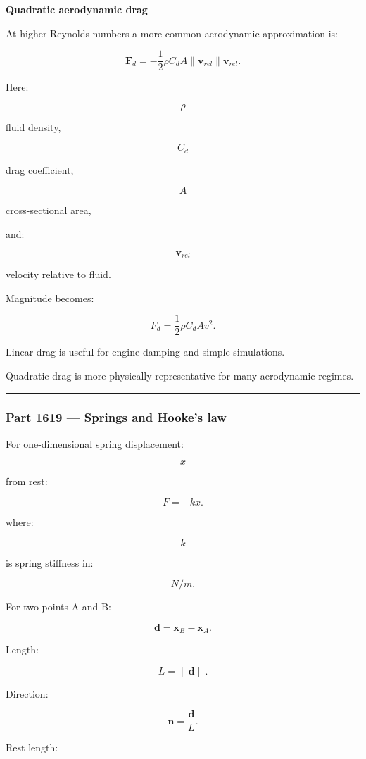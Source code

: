 \textbf{Quadratic aerodynamic drag}

At higher Reynolds numbers a more common aerodynamic approximation is:

\[
\boxed{
\mathbf{F}_d
=
-\frac12
\rho C_d A
\|\mathbf{v}_{rel}\|
\mathbf{v}_{rel}.
}
\]

Here:

\[
\rho
\]

fluid density,

\[
C_d
\]

drag coefficient,

\[
A
\]

cross-sectional area,

and:

\[
\mathbf{v}_{rel}
\]

velocity relative to fluid.

Magnitude becomes:

\[
F_d
=
\frac12\rho C_d A v^2.
\]

Linear drag is useful for engine damping and simple simulations.

Quadratic drag is more physically representative for many aerodynamic regimes.

\begin{center}\rule{0.5\linewidth}{0.5pt}\end{center}

\subsubsection{Part 1619 --- Springs and Hooke's law}\label{part-1619-springs-and-hookes-law}

For one-dimensional spring displacement:

\[
x
\]

from rest:

\[
\boxed{
F=-kx.
}
\]

where:

\[
k
\]

is spring stiffness in:

\[
N/m.
\]

For two points A and B:

\[
\mathbf{d}
=
\mathbf{x}_B-\mathbf{x}_A.
\]

Length:

\[
L=\|\mathbf{d}\|.
\]

Direction:

\[
\mathbf{n}
=
\frac{\mathbf{d}}{L}.
\]

Rest length:

